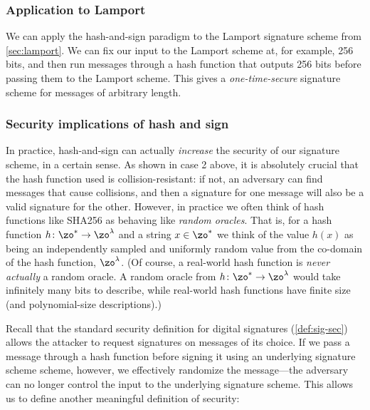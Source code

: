 \subsubsection{Application to Lamport}
We can apply the hash-and-sign paradigm to the Lamport signature scheme from \cref{sec:lamport}.
We can fix our input to the Lamport scheme at, for example, 256 bits, and then run messages through a hash function that outputs 256 bits before passing them to the Lamport scheme.
This gives a \emph{one-time-secure} signature scheme for messages of arbitrary length.

\subsubsection{Security implications of hash and sign}

In practice, hash-and-sign can actually \emph{increase} the security of our signature scheme, in a certain sense. As shown in case 2 above, it is absolutely crucial that the hash function used is collision-resistant: if not, an adversary can find messages that cause collisions, and then a signature for one message will also be a valid signature for the other. However, in practice we often think of hash functions like SHA256 as behaving like \emph{random oracles}.
That is, for a hash function $h \colon \zo^* \to \zo^\lambda$ and a string $x \in \zo^*$ we think of the value $h(x)$ as being an independently
sampled and uniformly random value from the co-domain of the hash function, $\zo^\lambda$.
(Of course, a real-world hash function is \emph{never actually} a random
oracle. A random oracle from $h \colon \zo^* \to \zo^\lambda$ would take
infinitely many bits to describe, while real-world hash functions have
finite size (and polynomial-size descriptions).)

Recall that the standard security definition for
digital signatures (\cref{def:sig-sec}) allows
the attacker to request signatures on messages
of its choice.
If we pass a message through a hash function before signing
it using an underlying signature scheme scheme, however, 
we effectively randomize the message---the adversary can no longer control the
input to the underlying signature scheme. This allows us to define
another meaningful definition of security:

